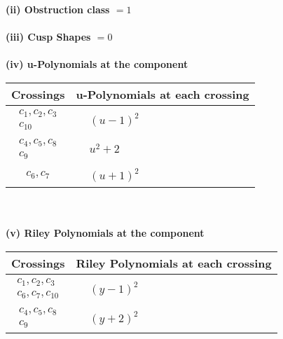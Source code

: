 \documentclass[1p]{elsarticle_modified}
\theoremstyle{definition}
\begin{document}
\flushleft \textbf{(ii) Obstruction class $= 1$}\\~\\
\flushleft \textbf{(iii) Cusp Shapes $= 0$}\\~\\
\newpage\renewcommand{\arraystretch}{1}
\flushleft \textbf{(iv) u-Polynomials at the component}\newline \\
\begin{tabular}{m{50pt}|m{274pt}}
Crossings & \hspace{64pt}u-Polynomials at each crossing \\
\hline $$\begin{aligned}c_{1},c_{2},c_{3}\\c_{10}\end{aligned}$$&$\begin{aligned}
&(u-1)^2
\end{aligned}$\\
\hline $$\begin{aligned}c_{4},c_{5},c_{8}\\c_{9}\end{aligned}$$&$\begin{aligned}
&u^2+2
\end{aligned}$\\
\hline $$\begin{aligned}c_{6},c_{7}\end{aligned}$$&$\begin{aligned}
&(u+1)^2
\end{aligned}$\\
\hline
\end{tabular}\\~\\
\newpage\renewcommand{\arraystretch}{1}
\flushleft \textbf{(v) Riley Polynomials at the component}\newline \\
\begin{tabular}{m{50pt}|m{274pt}}
Crossings & \hspace{64pt}Riley Polynomials at each crossing \\
\hline $$\begin{aligned}c_{1},c_{2},c_{3}\\c_{6},c_{7},c_{10}\end{aligned}$$&$\begin{aligned}
&(y-1)^2
\end{aligned}$\\
\hline $$\begin{aligned}c_{4},c_{5},c_{8}\\c_{9}\end{aligned}$$&$\begin{aligned}
&(y+2)^2
\end{aligned}$\\
\hline
\end{tabular}\\~\\
\end{document}

